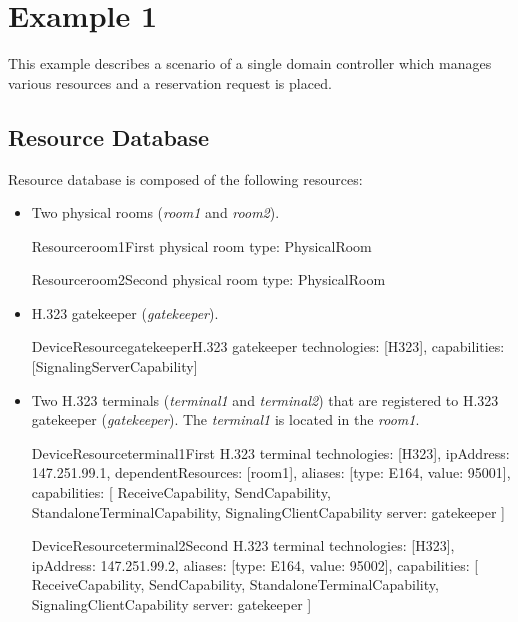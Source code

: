\section{Example 1}

This example describes a scenario of a single domain controller which manages various resources and a reservation request is placed.

\subsection{Resource Database}

Resource database is composed of the following resources:
\begin{itemize}
\item Two physical rooms (\emph{room1} and \emph{room2}).

\begin{EntityExample}{Resource}{room1}{First physical room}
type: PhysicalRoom
\end{EntityExample}

\begin{EntityExample}{Resource}{room2}{Second physical room}
type: PhysicalRoom
\end{EntityExample}

\item H.323 gatekeeper (\emph{gatekeeper}).

\begin{EntityExample}{DeviceResource}{gatekeeper}{H.323 gatekeeper}
technologies: [H323], 
capabilities: [SignalingServerCapability]
\end{EntityExample}

\item Two H.323 terminals (\emph{terminal1} and \emph{terminal2}) that are
  registered to H.323 gatekeeper (\emph{gatekeeper}). The \emph{terminal1} is
  located in the \emph{room1}.
  
\begin{EntityExample}{DeviceResource}{terminal1}{First H.323 terminal}
technologies: [H323], 
ipAddress: 147.251.99.1,
dependentResources: [room1],
aliases: [{type: E164, value: 95001}],
capabilities: [
  ReceiveCapability, SendCapability,
  StandaloneTerminalCapability,
  SignalingClientCapability {server: gatekeeper}
]
\end{EntityExample}

\begin{EntityExample}{DeviceResource}{terminal2}{Second H.323 terminal}
technologies: [H323], 
ipAddress: 147.251.99.2,
aliases: [{type: E164, value: 95002}],
capabilities: [
  ReceiveCapability, SendCapability,
  StandaloneTerminalCapability,
  SignalingClientCapability {server: gatekeeper}
]
\end{EntityExample}


\end{itemize}
